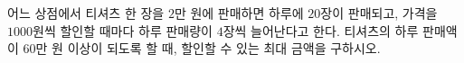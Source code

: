 어느 상점에서 티셔츠 한 장을 $2$만 원에 판매하면 하루에 $20$장이 판매되고, 가격을 $1000$원씩 할인할 때마다 하루 판매량이 $4$장씩 늘어난다고 한다. 티셔츠의 하루 판매액이 $60$만 원 이상이 되도록 할 때, 할인할 수 있는 최대 금액을 구하시오.
